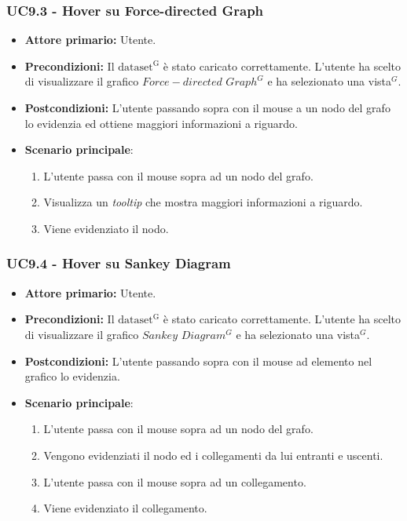 \subsubsection{UC9.3 - Hover su Force-directed Graph}
\label{sec:UC9.3}
\begin{itemize}
    \item \textbf{Attore primario:} Utente.
    \item \textbf{Precondizioni:} Il ${\mathrm{dataset^{G}}}$ è stato caricato correttamente. L'utente ha scelto di visualizzare il grafico $Force-directed$ $Graph^{G}$ e ha selezionato una vista$^{G}$.
    \item \textbf{Postcondizioni:} L'utente passando sopra con il mouse a un nodo del grafo lo evidenzia ed ottiene maggiori informazioni a riguardo.
    \item \textbf{Scenario principale}:
    \begin{enumerate}
		\item L'utente passa con il mouse sopra ad un nodo del grafo.
		\item Visualizza un \textit{tooltip} che mostra maggiori informazioni a riguardo.
		\item Viene evidenziato il nodo.
	\end{enumerate}
\end{itemize}

\subsubsection{UC9.4 - Hover su Sankey Diagram}
\label{sec:UC9.4}
\begin{itemize}
    \item \textbf{Attore primario:} Utente.
    \item \textbf{Precondizioni:} Il ${\mathrm{dataset^{G}}}$ è stato caricato correttamente. L'utente ha scelto di visualizzare il grafico $Sankey$ $Diagram^{G}$ e ha selezionato una vista$^{G}$.
    \item \textbf{Postcondizioni:} L'utente passando sopra con il mouse ad elemento nel grafico lo evidenzia.
    \item \textbf{Scenario principale}: 
    \begin{enumerate}
		\item L'utente passa con il mouse sopra ad un nodo del grafo.
		\item Vengono evidenziati il nodo ed i collegamenti da lui entranti e uscenti.
		\item L'utente passa con il mouse sopra ad un collegamento.
		\item Viene evidenziato il collegamento.
	\end{enumerate}
\end{itemize}

